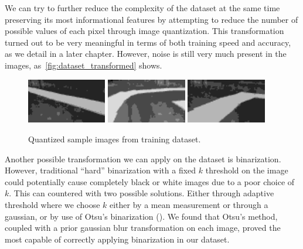 We can try to further reduce the complexity of the dataset at the same time preserving its most
informational features by attempting to reduce the number of possible values of each pixel through
image quantization. This transformation turned out to be very meaningful in terms of both training
speed and accuracy, as we detail in a later chapter. However, noise is still very much present in
the images, as~\autoref{fig:dataset_transformed} shows.

\begin{figure}[h]
  \centering\includegraphics[width=0.31\textwidth]{imgs/trans_left.png}
  \includegraphics[width=0.31\textwidth]{imgs/trans_up.png}
  \includegraphics[width=0.31\textwidth]{imgs/trans_right.png}
  \caption{Quantized sample images from training dataset.\label{fig:dataset_transformed}}
\end{figure}

Another possible transformation we can apply on the dataset is binarization. However, traditional
``hard'' binarization with a fixed $k$ threshold on the image could potentially cause completely
black or white images due to a poor choice of $k$. This can countered with two possible solutions.
Either through adaptive threshold where we choose $k$ either by a mean measurement or through a
gaussian, or by use of Otsu's binarization (\cite{otsu}). We found that Otsu's method, coupled with
a prior gaussian blur transformation on each image, proved the most capable of correctly applying
binarization in our dataset.

